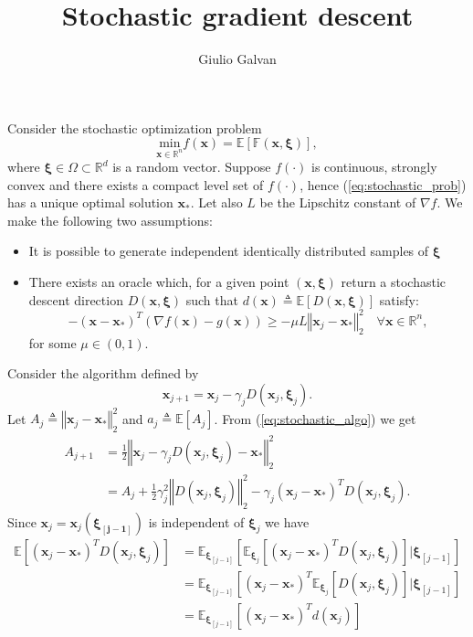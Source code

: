 \documentclass{article}
\title{Stochastic gradient descent}
\author{Giulio Galvan}
\renewcommand{\vec}[1]{\boldsymbol{#1}}
\newcommand{\norm}[1]{\left\Vert #1 \right\Vert}
\newcommand{\defeq}{\triangleq}
\begin{document}
	\maketitle
\noindent
Consider the stochastic optimization problem 
\begin{equation}
	\underset{\vec{x} \in \mathbb{R}^n}{\text{min}} f(\vec{x}) = \mathbb{E[F(\vec{x}, \vec{\xi})]},
	\label{eq:stochastic_prob}
\end{equation}
where $\vec{\xi} \in \Omega \subset \mathbb{R}^d$ is a random vector.
Suppose $f(\cdot)$ is continuous, strongly convex and there exists a compact level set of $f(\cdot)$, hence (\ref{eq:stochastic_prob}) has a unique optimal solution $\vec{x}_*$. Let also $L$ be the Lipschitz constant of $\nabla f$.
We make the following two assumptions:
\begin{itemize}
	\item	It is possible to generate independent identically distributed samples of $\vec{\xi}$
	\item There exists an oracle which, for a given point $(\vec{x}, \vec{\xi})$ return a stochastic descent direction $D(\vec{x}, \vec{\xi})$ such that $d(\vec{x})\defeq\mathbb{E}[D(\vec{x}, \vec{\xi})]$ satisfy:
	\begin{equation}
	-(\vec{x}-\vec{x}_*)^T (\nabla f(\vec{x}) -g(\vec{x})) \geq -\mu L \norm{\vec{x}_j-\vec{x}_*}^2_2\quad \forall \vec{x} \in \mathbb{R}^n,
	\label{eq:angular_condition}
	\end{equation}
	for some $\mu \in (0,1) $.
\end{itemize}
Consider the algorithm defined by
\begin{equation}
	\vec{x}_{j+1} = \vec{x}_j -\gamma_j D(\vec{x}_j,\vec{\xi}_j).
	\label{eq:stochastic_algo}
\end{equation}
Let $A_j\defeq \norm{\vec{x}_j-\vec{x}_*}^2_2$ and $a_j\defeq\mathbb{E}[A_j]$.
From (\ref*{eq:stochastic_algo}) we get
\begin{equation}
\begin{aligned}
	A_{j+1} &= \frac{1}{2}\norm{\vec{x}_j - \gamma_jD(\vec{x}_j,\vec{\xi}_j) -\vec{x}_*}^2_2\\ 
	&= A_j +\frac{1}{2}\gamma_j^2\norm{D(\vec{x}_j,\vec{\xi}_j)}^2_2 - \gamma_j(\vec{x}_j-\vec{x}_*)^TD(\vec{x}_j,\vec{\xi}_j).
\end{aligned}
\label{eq:aj_rec}
\end{equation}
Since $\vec{x}_j = \vec{x}_j(\vec{\xi_{[j-1]}})$ is independent of $\vec{\xi}_j$ we have
\begin{equation}
\begin{aligned}
	\mathbb{E}[(\vec{x}_j-\vec{x}_*)^TD(\vec{x}_j,\vec{\xi}_j)] &= \mathbb{E}_{\vec{\xi}_{[j-1]}}[\mathbb{E}_{\vec{\xi}_j}[(\vec{x}_j-\vec{x}_*)^TD(\vec{x}_j,\vec{\xi}_j)]|\vec{\xi}_{[j-1]}]\\
	&= \mathbb{E}_{\vec{\xi}_{[j-1]}}[(\vec{x}_j-\vec{x}_*)^T\mathbb{E}_{\vec{\xi}_j}[D(\vec{x}_j,\vec{\xi}_j)]|\vec{\xi}_{[j-1]}]\\
	&=\mathbb{E}_{\vec{\xi}_{[j-1]}}[(\vec{x}_j-\vec{x}_*)^Td(\vec{x}_j)]\\
\end{aligned}
\label{eq:independece}
\end{equation}
\end{document}

